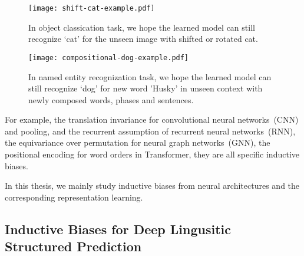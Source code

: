 \begin{figure}[!th]
  \centering
  \texttt{[image: shift-cat-example.pdf]}
  \caption{\label{fig:shift-cat-example}In object classication task,
    we hope the learned model can still recognize `cat' for the unseen
    image with shifted or rotated cat.}
\end{figure}

\begin{figure}[!th]
  \centering
  \texttt{[image: compositional-dog-example.pdf]}
  \caption{\label{fig:compositional-dog-example}In named entity
    recognization task, we hope the learned model can still recognize
    `dog' for new word 'Husky' in unseen context with newly composed
    words, phases and sentences.}
\end{figure}

For example, the
translation invariance for convolutional neural networks~(CNN) and
pooling, and the recurrent assumption of recurrent neural
networks~(RNN), the equivariance over permutation for neural graph
networks~(GNN), the positional encoding for word orders in
Transformer, they are all specific inductive biases.



%
In this thesis, we mainly study inductive biases from neural
architectures and the corresponding representation learning.

\subsection{Inductive Biases for Deep Lingusitic Structured
  Prediction}
\label{ssec:intro:bias-dsp}

